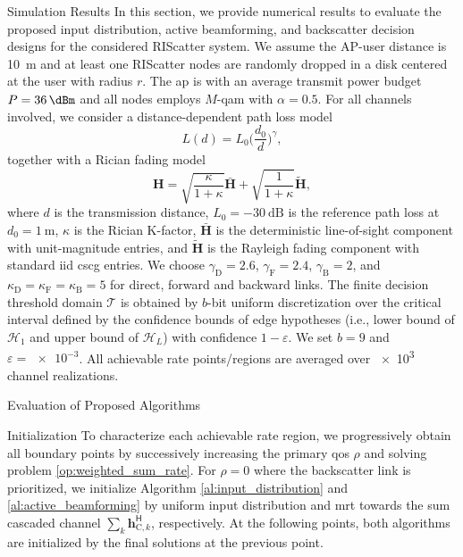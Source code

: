 \documentclass[journal]{IEEEtran}
\begin{document}
\begin{section}{Simulation Results}
	In this section, we provide numerical results to evaluate the proposed input distribution, active beamforming, and backscatter decision designs for the considered RIScatter system.
	We assume the AP-user distance is \SI{10}{\meter} and at least one RIScatter nodes are randomly dropped in a disk centered at the user with radius $r$.
	The \gls{ap} is with an average transmit power budget $P=\SI{36}{\dBm}$ and all nodes employs $M$-\gls{qam} with $\alpha=0.5$.
	For all channels involved, we consider a distance-dependent path loss model
	\begin{equation}
		L(d) = L_0 \biggl(\frac{d_0}{d}\biggr)^\gamma,
	\end{equation}
	together with a Rician fading model
	\begin{equation}
		\boldsymbol{H} = \sqrt{\frac{\kappa}{1+\kappa}} \bar{\boldsymbol{H}} + \sqrt{\frac{1}{1+\kappa}} \tilde{\boldsymbol{H}},
	\end{equation}
	where $d$ is the transmission distance, $L_0=-\SI{30}{\dB}$ is the reference path loss at $d_0=\SI{1}{\meter}$, $\kappa$ is the Rician K-factor, $\bar{\boldsymbol{H}}$ is the deterministic line-of-sight component with unit-magnitude entries, and $\tilde{\boldsymbol{H}}$ is the Rayleigh fading component with standard \gls{iid} \gls{cscg} entries.
	We choose $\gamma_{\text{D}}=2.6$, $\gamma_{\text{F}}=2.4$, $\gamma_{\text{B}}=2$, and $\kappa_{\text{D}}=\kappa_{\text{F}}=\kappa_{\text{B}}=5$ for direct, forward and backward links.
	The finite decision threshold domain $\mathcal{T}$ is obtained by $b$-bit uniform discretization over the critical interval defined by the confidence bounds of edge hypotheses (i.e., lower bound of $\mathcal{H}_1$ and upper bound of $\mathcal{H}_L$) with confidence $1-\varepsilon$.
	We set $b=9$ and $\varepsilon=\num{e-3}$.
	All achievable rate points/regions are averaged over \num{e3} channel realizations.

	\begin{subsection}{Evaluation of Proposed Algorithms}
		\begin{subsubsection}{Initialization}
			To characterize each achievable rate region, we progressively obtain all boundary points by successively increasing the primary \gls{qos} $\rho$ and solving problem \eqref{op:weighted_sum_rate}.
			For $\rho=0$ where the backscatter link is prioritized, we initialize Algorithm \ref{al:input_distribution} and \ref{al:active_beamforming} by uniform input distribution and \gls{mrt} towards the sum cascaded channel $\sum_{k} \boldsymbol{h}_{\text{C},k}^\mathsf{H}$, respectively.
			At the following points, both algorithms are initialized by the final solutions at the previous point.
		\end{subsubsection}


\end{subsection}
\end{section}
\end{document}
